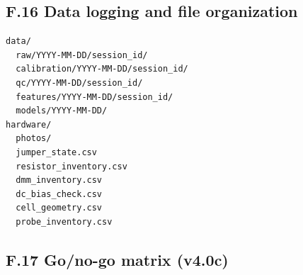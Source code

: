\documentclass[11pt,a4paper]{article}
\begin{document}
\subsection{F.16 Data logging and file organization}

\begin{verbatim}
data/
  raw/YYYY-MM-DD/session_id/
  calibration/YYYY-MM-DD/session_id/
  qc/YYYY-MM-DD/session_id/
  features/YYYY-MM-DD/session_id/
  models/YYYY-MM-DD/
hardware/
  photos/
  jumper_state.csv
  resistor_inventory.csv
  dmm_inventory.csv
  dc_bias_check.csv
  cell_geometry.csv
  probe_inventory.csv
\end{verbatim}

\subsection{F.17 Go/no-go matrix (v4.0c)}
\end{document}
